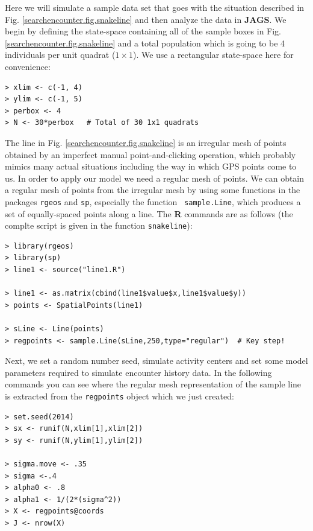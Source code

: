 Here we will simulate a sample data set that goes with the situation
described in Fig. \ref{searchencounter.fig.snakeline} and then
analyze the data in {\bf JAGS}.  We begin by defining the state-space
containing all of the sample boxes in
Fig. \ref{searchencounter.fig.snakeline} and a total population which
is going to be 4 individuals per unit quadrat ($1 \times 1$). We use a
rectangular state-space here for convenience:
\begin{verbatim}
> xlim <- c(-1, 4)
> ylim <- c(-1, 5)
> perbox <- 4
> N <- 30*perbox   # Total of 30 1x1 quadrats
\end{verbatim}
The line in Fig. \ref{searchencounter.fig.snakeline} is an irregular
mesh of points obtained by an imperfect manual point-and-clicking
operation, which probably mimics many actual situations including the
way in which GPS points come to us. In order to apply our model we
need a regular mesh of points. We can obtain a regular mesh of points
from the irregular mesh by using some functions in the packages
\mbox{\tt rgeos} and \mbox{\tt sp}, especially the function \mbox{\tt
  sample.Line}, which produces a set of equally-spaced points along a
line. The {\bf R} commands are as follows
(the complte script is 
given in the function \mbox{\tt snakeline}):
\begin{verbatim}
> library(rgeos)
> library(sp)
> line1 <- source("line1.R")

> line1 <- as.matrix(cbind(line1$value$x,line1$value$y))
> points <- SpatialPoints(line1)

> sLine <- Line(points)
> regpoints <- sample.Line(sLine,250,type="regular")  # Key step!
\end{verbatim}
Next, we set a random number seed, simulate activity centers and set
some model parameters required to simulate encounter history data.
In the following commands you can see where the
regular mesh representation of the sample line is extracted from the
\mbox{\tt regpoints} object which we just created:
\begin{verbatim}
> set.seed(2014)
> sx <- runif(N,xlim[1],xlim[2])
> sy <- runif(N,ylim[1],ylim[2])

> sigma.move <- .35
> sigma <-.4
> alpha0 <- .8
> alpha1 <- 1/(2*(sigma^2))
> X <- regpoints@coords
> J <- nrow(X)
\end{verbatim}

